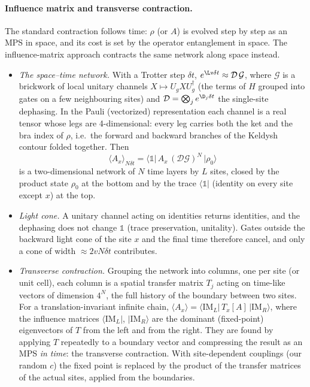 \paragraph{Influence matrix and transverse contraction.} The standard contraction follows time: $\rho$ (or $A$) is evolved step by step as an MPS in space, and its cost is set by the operator entanglement in space. The influence-matrix approach contracts the same network along space instead.
\begin{itemize}
\item \emph{The space--time network.} With a Trotter step $\delta t$, $e^{\Lv\delta t} \approx \mathcal D\,\mathcal G$, where $\mathcal G$ is a brickwork of local unitary channels $X \mapsto U_gXU_g^\dagger$ (the terms of $H$ grouped into gates on a few neighbouring sites) and $\mathcal D = \bigotimes_j e^{\D_j\delta t}$ the single-site dephasing. In the Pauli (vectorized) representation each channel is a real tensor whose legs are 4-dimensional: every leg carries both the ket and the bra index of $\rho$, i.e.\ the forward and backward branches of the Keldysh contour folded together. Then
\[ \langle A_x\rangle_{N\delta t} = \big\langle \mathds 1\big|\,A_x\,(\mathcal D\mathcal G)^N\,\big|\rho_0\big\rangle \]
is a two-dimensional network of $N$ time layers by $L$ sites, closed by the product state $\rho_0$ at the bottom and by the trace $\langle\mathds 1|$ (identity on every site except $x$) at the top.
\item \emph{Light cone.} A unitary channel acting on identities returns identities, and the dephasing does not change $\mathds 1$ (trace preservation, unitality). Gates outside the backward light cone of the site $x$ and the final time therefore cancel, and only a cone of width $\approx 2vN\delta t$ contributes.
\item \emph{Transverse contraction.} Grouping the network into columns, one per site (or unit cell), each column is a spatial transfer matrix $T_j$ acting on time-like vectors of dimension $4^N$, the full history of the boundary between two sites. For a translation-invariant infinite chain, $\langle A_x\rangle = \langle \mathrm{IM}_L|\,T_x[A]\,|\mathrm{IM}_R\rangle$, where the influence matrices $\langle\mathrm{IM}_L|$, $|\mathrm{IM}_R\rangle$ are the dominant (fixed-point) eigenvectors of $T$ from the left and from the right. They are found by applying $T$ repeatedly to a boundary vector and compressing the result as an MPS \emph{in time}: the transverse contraction. With site-dependent couplings (our random $c$) the fixed point is replaced by the product of the transfer matrices of the actual sites, applied from the boundaries.

\end{itemize}
